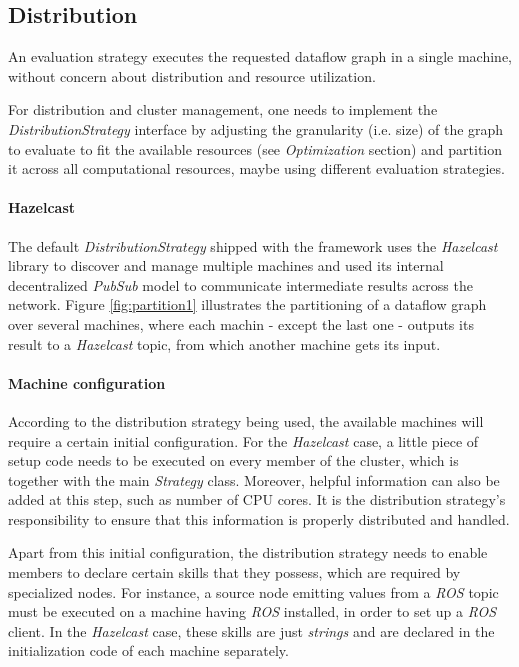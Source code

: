 \documentclass[sigplan,review,anonymous]{acmart}
\begin{document}
\subsection{Distribution}

An evaluation strategy executes the requested dataflow graph in a single
machine, without concern about distribution and resource utilization.

For distribution and cluster management, one needs to implement
the \textit{DistributionStrategy} interface by adjusting the granularity (i.e. size) of
the graph to evaluate to fit the available resources (see \textit{Optimization} section)
and partition it across all computational resources, maybe using different evaluation strategies.

\paragraph{Hazelcast}
The default \textit{DistributionStrategy} shipped with the framework uses
the \textit{Hazelcast} library to discover and
manage multiple machines and used its internal decentralized \textit{PubSub} model to communicate
intermediate results across the network. Figure \ref{fig:partition1} illustrates
the partitioning of a dataflow graph over several machines, where each machin
- except the last one - outputs its result to a \textit{Hazelcast} topic, from which
another machine gets its input.


\paragraph{Machine configuration}
According to the distribution strategy being used, the available machines will
require a certain initial configuration. For the \textit{Hazelcast} case, a
little piece of setup code needs to be executed on every member of the cluster,
which is together with the main \textit{Strategy} class. Moreover, helpful
information can also be added at this step, such as number of CPU cores. It is
the distribution strategy's responsibility to ensure that this information is
properly distributed and handled.

Apart from this initial configuration, the distribution strategy needs to enable
members to declare certain skills that they possess, which are required by
specialized nodes. For instance, a source node emitting values from a
\textit{ROS} topic must be executed on a machine having \textit{ROS} installed,
in order to set up a \textit{ROS} client. In the \textit{Hazelcast} case, these
skills are just \textit{strings} and are declared in the initialization code of
each machine separately.
\end{document}
